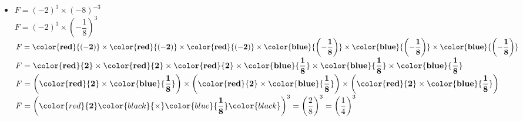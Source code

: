 \begin{corrige}
\begin{itemize}
        \bigskip
        \item $F=(-2)^3\times (-8)^{-3}$\\
        $F=(-2)^3\times \left(-\dfrac{1}{8}\right)^3$\\
        $F=\mathbf{\color{red}{(-2)}} \times \mathbf{\color{red}{(-2)}}\times \mathbf{\color{red}{(-2)}} \times \mathbf{\color{blue}{\left(-\dfrac{1}{8}\right)}}\times \mathbf{\color{blue}{\left(-\dfrac{1}{8}\right)}}\times \mathbf{\color{blue}{\left(-\dfrac{1}{8}\right)}}$\\
        $F=\mathbf{\color{red}{2}} \times \mathbf{\color{red}{2}}\times \mathbf{\color{red}{2}} \times \mathbf{\color{blue}{\dfrac{1}{8}}}\times \mathbf{\color{blue}{\dfrac{1}{8}}}\times \mathbf{\color{blue}{\dfrac{1}{8}}}$\\
        $F=\left(\mathbf{\color{red}{2}} \times \mathbf{\color{blue}{\dfrac{1}{8}}}\right)\times \left(\mathbf{\color{red}{2}} \times \mathbf{\color{blue}{\dfrac{1}{8}}}\right)\times \left(\mathbf{\color{red}{2}} \times \mathbf{\color{blue}{\dfrac{1}{8}}}\right)$\\
        $F= \left(\color{red}{\mathbf{2}} \color{black}{\times} \color{blue}{\mathbf{\dfrac{1}{8}}}\color{black}\right)^{3}=\left(\dfrac{2}{8}\right)^3=\left(\dfrac{1}{4}\right)^3$
    \end{itemize}
\end{corrige}

